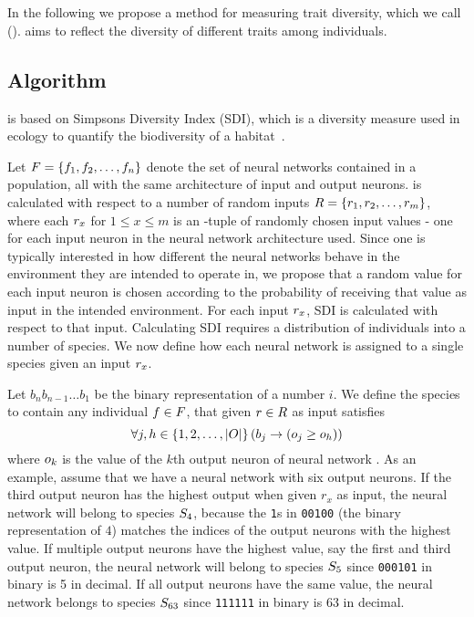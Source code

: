 \section{\di{}}\label{sec:nntd}
In the following we propose a method for measuring trait diversity, which we call \emph{\di{}} (\dia). \dia{} aims to reflect the diversity of different traits among individuals. 

\subsection{Algorithm}
\dia{} is based on Simpsons Diversity Index (SDI), which is a diversity measure used in ecology to quantify the biodiversity of a habitat~\cite{simpson1949measurement}.

Let $F = \left\{ f_1, f_2, \dots, f_n \right\}$ denote the set of neural networks contained in a population, all with the same architecture of \nninsetl{} input and \nnoutsetl{} output neurons. \dia{} is calculated with respect to a number of random inputs $R = \left\{ r_1, r_2, \dots, r_m \right\}$, where each $r_x$ for $1 \leq x \leq m$ is an \nninsetl-tuple of randomly chosen input values - one for each input neuron in the neural network architecture used.
Since one is typically interested in how different the neural networks behave in the environment they are intended to operate in, we propose that a random value for each input neuron is chosen according to the probability of receiving that value as input in the intended environment. For each input $r_x$, SDI is calculated with respect to that input.
Calculating SDI requires a distribution of individuals into a number of species.
We now define how each neural network is assigned to a single species given an input $r_x$. 

Let $b_{n}b_{n-1}\dots b_1$ be the binary representation of a number $i$.
We define the species  to contain any individual $f \in F$, that given $r \in R$ as input satisfies
%
\begin{equation}\label{eq:nntdbucket}
  \forall j, h \in \left\{ 1, 2, \dots, \lvert O\rvert \right\} \left(b_j \rightarrow \left(o_j \geq o_h\right)\right)
\end{equation}
%
where $o_k$ is the value of the $k$th output neuron of neural network \ind.
As an example, assume that we have a neural network with six output neurons. If the third output neuron has the highest output when given $r_x$ as input, the neural network will belong to species $S_4$, because the \texttt{1}s in \texttt{00100} (the binary representation of $4$) matches the indices of the output neurons with the highest value. If multiple output neurons have the highest value, say the first and third output neuron, the neural network will belong to species $S_5$ since \texttt{000101} in binary is 5 in decimal. If all output neurons have the same value, the neural network belongs to species $S_{63}$ since \texttt{111111} in binary is 63 in decimal.


